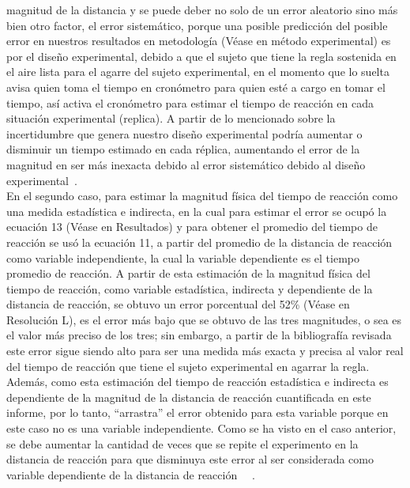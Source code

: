 \documentclass[runningheads]{llncs}
\begin{document}
    magnitud de la distancia y se puede deber no solo de un error aleatorio sino más bien otro factor, el error sistemático, porque una posible predicción del posible error en nuestros resultados en metodología 
    (Véase en método experimental) es por el diseño experimental, debido a que el sujeto que tiene la regla sostenida en el aire lista para el agarre del sujeto experimental, en el momento que lo suelta avisa quien toma el tiempo en cronómetro para quien esté a cargo en tomar el tiempo, 
    así activa el cronómetro para estimar el tiempo de reacción en cada situación experimental (replica). A partir de lo mencionado sobre la incertidumbre que genera nuestro diseño experimental podría aumentar o disminuir un tiempo estimado en cada réplica, aumentando el error de la 
    magnitud en ser más inexacta debido al error sistemático debido al diseño experimental~\cite{Ratinoff}.\\
    \linebreak 
    En el segundo caso, para estimar la magnitud física del tiempo de reacción como una medida estadística e indirecta, en la cual para estimar el error se ocupó la ecuación 13 (Véase en Resultados) 
    y para obtener el promedio del tiempo de reacción se usó la ecuación 11, a partir del promedio de la distancia de reacción como variable independiente, la cual la variable dependiente es el tiempo promedio de reacción. 
    A partir de esta estimación de la magnitud física del tiempo de reacción, como variable estadística, indirecta y dependiente de la distancia de reacción, se obtuvo un error porcentual del 52\% (Véase en Resolución L), 
    es el error más bajo que se obtuvo de las tres magnitudes, o sea es el valor más preciso de los tres; sin embargo, a partir de la bibliografía revisada~\cite{quezada2007potencia} este error sigue siendo alto para ser una medida más exacta 
    y precisa al valor real del tiempo de reacción que tiene el sujeto experimental en agarrar la regla. Además, como esta estimación del tiempo de reacción estadística e indirecta es dependiente de la magnitud de la 
    distancia de reacción cuantificada en este informe, por lo tanto, “arrastra” el error obtenido para esta variable porque en este caso no es una variable independiente. Como se ha visto en el caso anterior, 
    se debe aumentar la cantidad de veces que se repite el experimento en la distancia de reacción para que disminuya este error al ser considerada como variable dependiente de la distancia de reacción ~\cite{Ratinoff}~\cite{quezada2007potencia}. 
\end{document}
